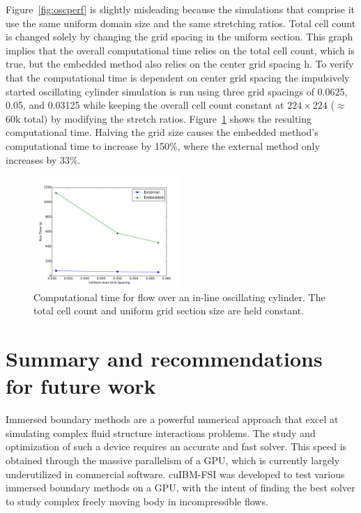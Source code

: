 \documentclass[preprint,12pt,5p]{elsarticle}
\begin{document}
Figure~\ref{fig:oscperf} is slightly misleading because the simulations that comprise it use the same uniform domain size and the same stretching ratios. 
Total cell count is changed solely by changing the grid spacing in the uniform section. 
This graph implies that the overall computational time relies on the total cell count, which is true, but the embedded method also relies on the center grid spacing h. 
To verify that the computational time is dependent on center grid spacing the impulsively started oscillating cylinder simulation is run using three grid spacings of 0.0625, 0.05, and 0.03125 while keeping the overall cell count constant at $224\times224$ ($\approx$60k total) by modifying the stretch ratios. 
Figure~\ref{fig:performance2} shows the resulting computational time. 
Halving the grid size causes the embedded method's computational time to increase by 150\%, where the external method only increases by 33\%.
\begin{figure}[!htb]
	\centering
	\includegraphics[width=0.5\textwidth]{performance_oscflow2}
	\caption{Computational time for flow over an in-line oscillating cylinder. The total cell count and uniform grid section size are held constant.}
	\label{fig:performance2}
\end{figure}

\section{Summary and recommendations for future work} 
Immersed boundary methods are a powerful numerical approach that excel at simulating complex fluid structure interactions problems. 
The study and optimization of such a device requires an accurate and fast solver. 
This speed is obtained through the massive parallelism of a GPU, which is currently largely underutilized in commercial software. 
cuIBM-FSI was developed to test various immersed boundary methods on a GPU, with the intent of finding the best solver to study complex freely moving body in incompressible flows. 
\end{document}
